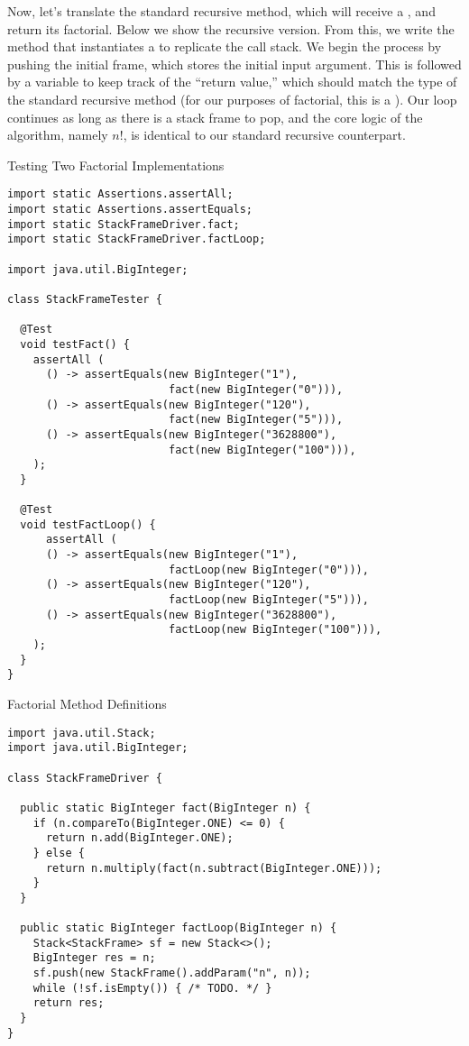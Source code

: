 Now, let's translate the standard recursive  method, which will receive a , and return its factorial. Below we show the recursive version. From this, we write the  method that instantiates a  to replicate the call stack. We begin the process by pushing the initial frame, which stores the initial input argument. This is followed by a variable to keep track of the ``return value,'' which should match the type of the standard recursive method (for our purposes of factorial, this is a ). Our loop continues as long as there is a stack frame to pop, and the core logic of the algorithm, namely $n!$, is identical to our standard recursive counterpart.

\begin{cl}{Testing Two Factorial Implementations}
\begin{lstlisting}[language=MyJava]
import static Assertions.assertAll;
import static Assertions.assertEquals;
import static StackFrameDriver.fact;
import static StackFrameDriver.factLoop;

import java.util.BigInteger;

class StackFrameTester {

  @Test
  void testFact() {
    assertAll (
      () -> assertEquals(new BigInteger("1"), 
                         fact(new BigInteger("0"))),
      () -> assertEquals(new BigInteger("120"), 
                         fact(new BigInteger("5"))),
      () -> assertEquals(new BigInteger("3628800"), 
                         fact(new BigInteger("100"))),
    );
  }

  @Test
  void testFactLoop() {
      assertAll (
      () -> assertEquals(new BigInteger("1"), 
                         factLoop(new BigInteger("0"))),
      () -> assertEquals(new BigInteger("120"), 
                         factLoop(new BigInteger("5"))),
      () -> assertEquals(new BigInteger("3628800"), 
                         factLoop(new BigInteger("100"))),
    );
  }
}  
\end{lstlisting}
\end{cl}

\begin{cl}{Factorial Method Definitions}
\begin{lstlisting}[language=MyJava]
import java.util.Stack;
import java.util.BigInteger;

class StackFrameDriver {

  public static BigInteger fact(BigInteger n) {
    if (n.compareTo(BigInteger.ONE) <= 0) {
      return n.add(BigInteger.ONE);
    } else {
      return n.multiply(fact(n.subtract(BigInteger.ONE)));
    }
  }

  public static BigInteger factLoop(BigInteger n) {
    Stack<StackFrame> sf = new Stack<>();
    BigInteger res = n;
    sf.push(new StackFrame().addParam("n", n));
    while (!sf.isEmpty()) { /* TODO. */ }
    return res;
  }
}
\end{lstlisting}
\end{cl}

